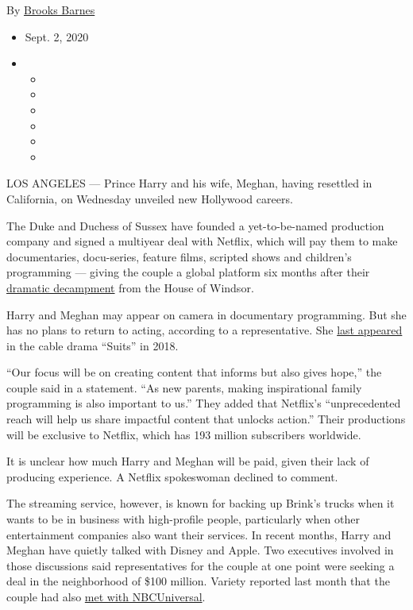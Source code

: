 By \href{https://www.nytimes3xbfgragh.onion/by/brooks-barnes}{Brooks
Barnes}

\begin{itemize}
\item
  Sept. 2, 2020
\item
  \begin{itemize}
  \item
  \item
  \item
  \item
  \item
  \item
  \end{itemize}
\end{itemize}

LOS ANGELES --- Prince Harry and his wife, Meghan, having resettled in
California, on Wednesday unveiled new Hollywood careers.

The Duke and Duchess of Sussex have founded a yet-to-be-named production
company and signed a multiyear deal with Netflix, which will pay them to
make documentaries, docu-series, feature films, scripted shows and
children's programming --- giving the couple a global platform six
months after their
\href{https://www.nytimes3xbfgragh.onion/2020/03/09/world/europe/harry-meghan-royal-exit.html}{dramatic
decampment} from the House of Windsor.

Harry and Meghan may appear on camera in documentary programming. But
she has no plans to return to acting, according to a representative. She
\href{https://www.nytimes3xbfgragh.onion/2018/04/25/arts/television/meghan-markle-leaves-suits-finale.html\#:~:text=An\%20earlier\%20version\%20of\%20this,final\%20episode\%20of\%20the\%20series.}{last
appeared} in the cable drama ``Suits'' in 2018.

``Our focus will be on creating content that informs but also gives
hope,'' the couple said in a statement. ``As new parents, making
inspirational family programming is also important to us.'' They added
that Netflix's ``unprecedented reach will help us share impactful
content that unlocks action.'' Their productions will be exclusive to
Netflix, which has 193 million subscribers worldwide.

It is unclear how much Harry and Meghan will be paid, given their lack
of producing experience. A Netflix spokeswoman declined to comment.

The streaming service, however, is known for backing up Brink's trucks
when it wants to be in business with high-profile people, particularly
when other entertainment companies also want their services. In recent
months, Harry and Meghan have quietly talked with Disney and Apple. Two
executives involved in those discussions said representatives for the
couple at one point were seeking a deal in the neighborhood of \$100
million. Variety reported last month that the couple had also
\href{https://variety.com/2020/tv/news/prince-harry-meghan-markle-pitch-meetings-tv-project-1234734074/}{met
with NBCUniversal}.

